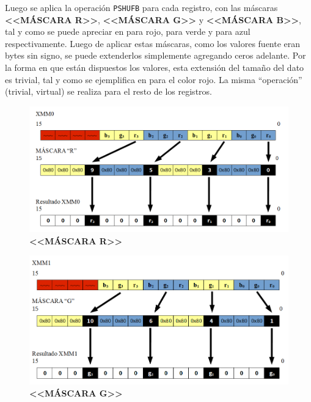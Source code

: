 Luego se aplica la operación \texttt{PSHUFB} para cada registro, con las
máscaras \textbf{<<MÁSCARA R>>}, \textbf{<<MÁSCARA G>>} y \textbf{<<MÁSCARA
B>>}, tal y como se puede apreciar en  para rojo,
 para verde y  para azul respectivamente.
Luego de aplicar estas máscaras, como los valores fuente eran bytes sin signo,
se puede extenderlos simplemente agregando ceros adelante. Por la forma en que
están dispuestos los valores, esta extensión del tamaño del dato es trivial, tal
y como se ejemplifica en  para el color rojo. La misma
``operación'' (trivial, virtual) se realiza para el resto de los registros.

\begin{figure}[h]
  \begin{center}
  \includegraphics[scale=0.55]{imagenes/popart-mask-r.png}
  \caption{\textbf{<<MÁSCARA R>>}}
  \label{fig:popart_mask_r}
  \end{center}
\end{figure}

\begin{figure}[h]
  \begin{center}
  \includegraphics[scale=0.55]{imagenes/popart-mask-g.png}
  \caption{\textbf{<<MÁSCARA G>>}}
  \label{fig:popart_mask_g}
  \end{center}
\end{figure}

